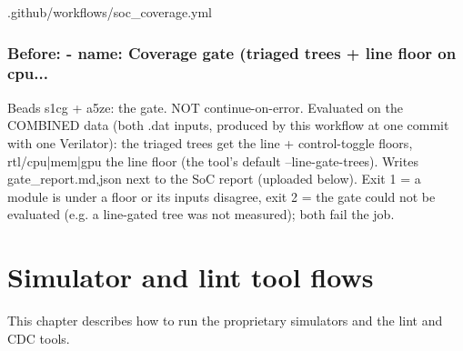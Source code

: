 \begin{relocated}{.github/workflows/soc_coverage.yml}

\subsection*{Before: - name: Coverage gate (triaged trees + line floor on cpu...}

\begin{textblock}
Beads s1cg + a5ze: the gate.  NOT continue-on-error.  Evaluated on the COMBINED data (both
.dat inputs, produced by this workflow at one commit with one Verilator): the triaged trees get
the line + control-toggle floors, rtl/cpu|mem|gpu the line floor (the tool's default
--line-gate-trees).  Writes gate_report.{md,json} next to the SoC report (uploaded below).
Exit 1 = a module is under a floor or its inputs disagree, exit 2 = the gate could not be
evaluated (e.g. a line-gated tree was not measured); both fail the job.
\end{textblock}

\end{relocated}

\chapter{Simulator and lint tool flows}\label{um:ch:tool-flows}

This chapter describes how to run the proprietary simulators and the lint and CDC tools.


